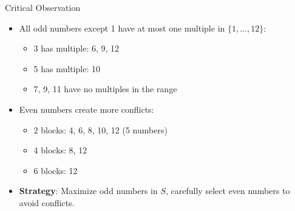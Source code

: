 \documentclass[12pt]{article}
\begin{document}
\begin{tacticalbox}
\begin{highlightbox}{Critical Observation}
\begin{itemize}
    \item All odd numbers except 1 have at most one multiple in $\{1,\ldots,12\}$:
    \begin{itemize}
        \item 3 has multiple: 6, 9, 12
        \item 5 has multiple: 10
        \item 7, 9, 11 have no multiples in the range
    \end{itemize}
    
    \item Even numbers create more conflicts:
    \begin{itemize}
        \item 2 blocks: 4, 6, 8, 10, 12 (5 numbers)
        \item 4 blocks: 8, 12
        \item 6 blocks: 12
    \end{itemize}
    
    \item \textbf{Strategy}: Maximize odd numbers in $S$, carefully select even numbers to avoid conflicts.
\end{itemize}
\end{highlightbox}
\end{tacticalbox}
\end{document}
